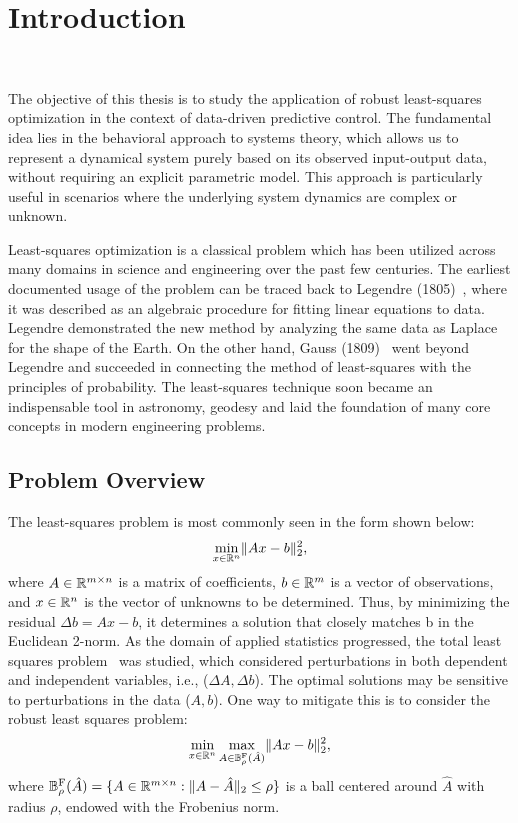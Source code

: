 \chapter{Introduction}~\label{ch:Introduction}

The objective of this thesis is to study the application of robust least-squares optimization in the context of data-driven predictive control. The fundamental idea lies in the behavioral approach to systems theory, which allows us to represent a dynamical system purely based on its observed input-output data, without requiring an explicit parametric model. This approach is particularly useful in scenarios where the underlying system dynamics are complex or unknown. 

Least-squares optimization is a classical problem which has been utilized across many domains in science and engineering over the past few centuries. The earliest documented usage of the problem can be traced back to Legendre (1805)~\cite{Legendre1805}, where it was described as an algebraic procedure for fitting linear equations to data. Legendre demonstrated the new method by analyzing the same data as Laplace for the shape of the Earth. On the other hand, Gauss (1809)~\cite{Gauss1809} went beyond Legendre and succeeded in connecting the method of least-squares with the principles of probability. The least-squares technique soon became an indispensable tool in astronomy, geodesy and laid the foundation of many core concepts in modern engineering problems.

\section{Problem Overview}

The least-squares problem is most commonly seen in the form shown below:
\begin{equation}
    \min_{x \in \mathbb{R}^n} \lVert A x - b \rVert_2^2,
\end{equation}
where $A \in \mathbb{R}^{m \times n}$ is a matrix of coefficients, $b \in \mathbb{R}^m$ is a vector of observations, and $x \in \mathbb{R}^n$ is the vector of unknowns to be determined. Thus, by minimizing the residual $\Delta b = A x - b$, it determines a solution that closely matches b in the Euclidean 2-norm. As the domain of applied statistics progressed, the total least squares problem~\cite{golub1980} was studied, which considered perturbations in both dependent and independent variables, i.e., ($\Delta A, \Delta b$). The optimal solutions may be sensitive to perturbations in the data ($A, b$). One way to mitigate this is to consider the robust least squares problem:
\begin{equation}
    \min_{x \in \mathbb{R}^n} \max_{A \in \mathbb{B}^{\textrm{F}}_{\rho}(\hat{A})} \lVert Ax - b \rVert_2^2,
\end{equation}
where $\mathbb{B}_{\rho}^{\mathrm{F}}(\hat{A}) = \{ A \in \mathbb{R}^{m \times n} : \lVert A - \hat{A} \rVert_2 \leq \rho \}$ is a ball centered around $\hat{A}$ with radius $\rho$, endowed with the Frobenius norm. 

